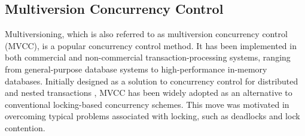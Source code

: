 \subsection{Multiversion Concurrency Control}

%

Multiversioning, which is also referred to as multiversion concurrency control
(MVCC), is a popular concurrency control method. It has been implemented in both
commercial and non-commercial transaction-processing systems, ranging from
general-purpose database systems to high-performance in-memory databases.
Initially designed as a solution to concurrency control for distributed and
nested transactions \cite{reed1978naming}, MVCC has been widely adopted as an
alternative to conventional locking-based concurrency schemes. This move was
motivated in overcoming typical problems associated with locking, such as
deadlocks and lock contention.

